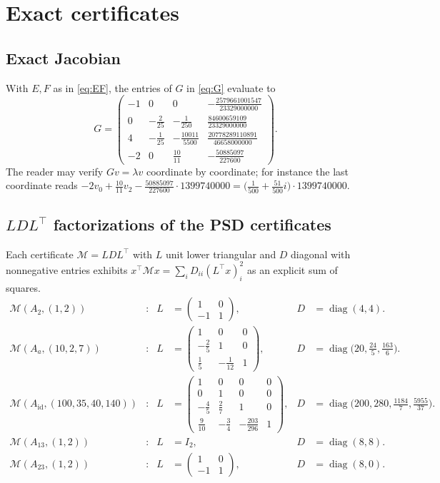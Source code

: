 \documentclass[11pt,a4paper]{article}
\theoremstyle{definition}
\theoremstyle{remark}
\newcommand{\diag}{\operatorname{diag}}
\newcommand{\Sym}{\mathcal{M}}
\newcommand{\Ecst}{E}
\newcommand{\Fcst}{F}
\begin{document}
\section{Exact certificates}\label{app:certificates}

\subsection{Exact Jacobian}

With $\Ecst,\Fcst$ as in \eqref{eq:EF}, the entries of $G$ in \eqref{eq:G} evaluate to
\[
G=\begin{pmatrix}
-1&0&0&-\tfrac{2579661001547}{23329000000}\\[3pt]
0&-\tfrac{2}{25}&-\tfrac{1}{250}&\tfrac{84600659109}{23329000000}\\[3pt]
4&-\tfrac{1}{25}&-\tfrac{10011}{5500}&\tfrac{20778289110891}{46658000000}\\[3pt]
-2&0&\tfrac{10}{11}&-\tfrac{50885097}{227600}
\end{pmatrix}.
\]
The reader may verify $Gv=\lambda v$ coordinate by coordinate; for instance the last coordinate reads
$-2v_0+\tfrac{10}{11}v_2-\tfrac{50885097}{227600}\cdot1399740000=\bigl(\tfrac1{500}+\tfrac{51}{500}i\bigr)\cdot1399740000$.

\subsection{\texorpdfstring{$LDL^{\top}$}{LDL-transpose} factorizations of the PSD certificates}

Each certificate $\Sym=LDL^{\top}$ with $L$ unit lower triangular and $D$ diagonal with nonnegative entries exhibits $x^{\top}\Sym x=\sum_i D_{ii}(L^{\top}x)_i^2$ as an explicit sum of squares.
\begin{align*}
\Sym(A_2,(1,2)) &: & L&=\begin{pmatrix}1&0\\-1&1\end{pmatrix}, & D&=\diag(4,4).\\[4pt]
\Sym(A_a,(10,2,7)) &: & L&=\begin{pmatrix}1&0&0\\-\tfrac25&1&0\\ \tfrac15&-\tfrac1{12}&1\end{pmatrix}, & D&=\diag\bigl(20,\tfrac{24}{5},\tfrac{163}{6}\bigr).\\[4pt]
\Sym(A_{\mathrm{id}},(100,35,40,140)) &: & L&=\begin{pmatrix}1&0&0&0\\0&1&0&0\\-\tfrac45&\tfrac27&1&0\\ \tfrac9{10}&-\tfrac34&-\tfrac{203}{296}&1\end{pmatrix}, & D&=\diag\bigl(200,280,\tfrac{1184}{7},\tfrac{5955}{37}\bigr).\\[4pt]
\Sym(A_{13},(1,2)) &: & L&=I_2, & D&=\diag(8,8).\\[4pt]
\Sym(A_{23},(1,2)) &: & L&=\begin{pmatrix}1&0\\-1&1\end{pmatrix}, & D&=\diag(8,0).
\end{align*}
\end{document}
